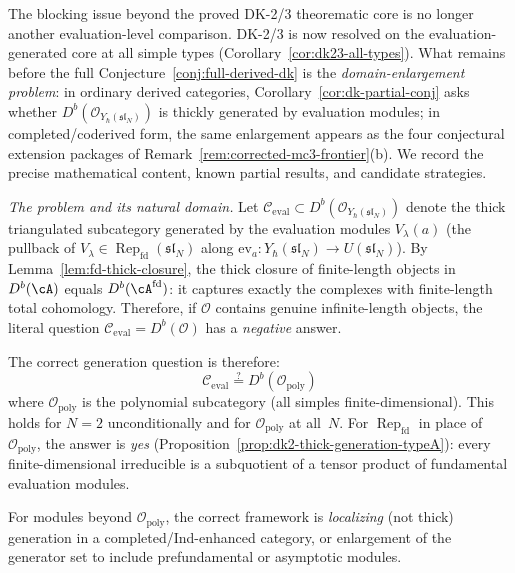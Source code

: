 \begin{remark}
\label{rem:cat-o-generation-obstruction}
The blocking issue beyond the proved DK-2/3 theorematic core is no
longer another evaluation-level comparison.  DK-2/3 is now resolved on
the evaluation-generated core at all simple types
\textup{(}Corollary~\ref{cor:dk23-all-types}\textup{)}.  What remains
before the full Conjecture~\ref{conj:full-derived-dk} is the
\emph{domain-enlargement problem}: in ordinary derived categories,
Corollary~\ref{cor:dk-partial-conj} asks whether
$D^b(\mathcal{O}_{Y_\hbar(\mathfrak{sl}_N)})$ is thickly generated by
evaluation modules; in completed/coderived form, the same enlargement
appears as the four conjectural extension packages of
Remark~\ref{rem:corrected-mc3-frontier}(b).  We record the precise
mathematical content, known partial results, and candidate strategies.

\emph{The problem and its natural domain.}
Let $\mathcal{C}_{\mathrm{eval}} \subset
D^b(\mathcal{O}_{Y_\hbar(\mathfrak{sl}_N)})$ denote the thick
triangulated subcategory generated by the evaluation modules
$V_\lambda(a)$ (the pullback of $V_\lambda \in
\operatorname{Rep}_{\mathrm{fd}}(\mathfrak{sl}_N)$ along
$\mathrm{ev}_a\colon Y_\hbar(\mathfrak{sl}_N) \to
U(\mathfrak{sl}_N)$).
By Lemma~\ref{lem:fd-thick-closure}, the thick closure of
finite-length objects in $D^b(\cA)$ equals $D^b(\cA^{\mathrm{fd}})$:
it captures exactly the complexes with finite-length total
cohomology.  Therefore, if $\mathcal{O}$ contains genuine
infinite-length objects, the literal question
$\mathcal{C}_{\mathrm{eval}} = D^b(\mathcal{O})$ has a
\emph{negative} answer.

The correct generation question is therefore:
\[
\mathcal{C}_{\mathrm{eval}} \stackrel{?}{=}
D^b(\mathcal{O}_{\mathrm{poly}})
\]
where $\mathcal{O}_{\mathrm{poly}}$ is the polynomial subcategory
(all simples finite-dimensional).  This holds for $N = 2$
unconditionally and for $\mathcal{O}_{\mathrm{poly}}$ at all~$N$.
For $\operatorname{Rep}_{\mathrm{fd}}$ in place of
$\mathcal{O}_{\mathrm{poly}}$,
the answer is \emph{yes}
(Proposition~\ref{prop:dk2-thick-generation-typeA}): every
finite-dimensional irreducible is a subquotient of a tensor product
of fundamental evaluation modules.

For modules beyond $\mathcal{O}_{\mathrm{poly}}$, the correct
framework is \emph{localizing} (not thick) generation in a
completed/Ind-enhanced category, or enlargement of the
generator set to include prefundamental or asymptotic modules.


\end{remark}
